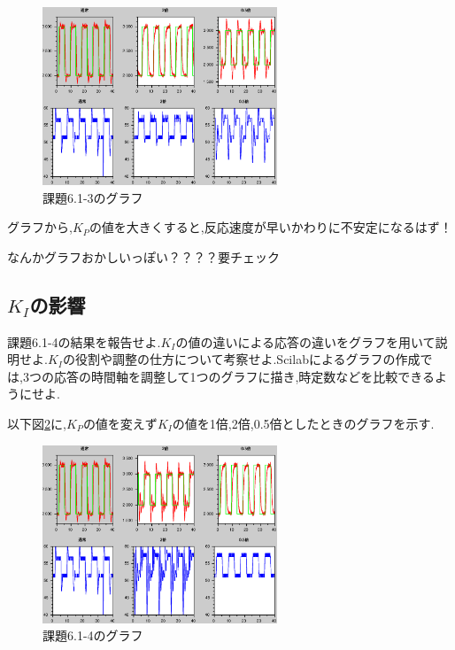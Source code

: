 \documentclass{jarticle}
\begin{document}
\begin{figure}[H]
\begin{center}
\includegraphics[width=7.0cm]{images/kadai6-1-3.eps}
\caption{課題6.1-3のグラフ}
\label{fig:kadai6-1-3}
\end{center}
\end{figure}

グラフから,$K_P$の値を大きくすると,反応速度が早いかわりに不安定になるはず！

なんかグラフおかしいっぽい？？？？要チェック


\subsection{$K_I$の影響}
課題6.1-4の結果を報告せよ.$K_I$の値の違いによる応答の違いをグラフを用いて説明せよ.$K_I$の役割や調整の仕方について考察せよ.Scilabによるグラフの作成では,3つの応答の時間軸を調整して1つのグラフに描き,時定数などを比較できるようにせよ.

以下図\ref{fig:kadai6-1-4}に,$K_P$の値を変えず$K_I$の値を1倍,2倍,0.5倍としたときのグラフを示す.

\begin{figure}[H]
\begin{center}
\includegraphics[width=7.0cm]{images/kadai6-1-4.eps}
\caption{課題6.1-4のグラフ}
\label{fig:kadai6-1-4}
\end{center}
\end{figure}
\end{document}
